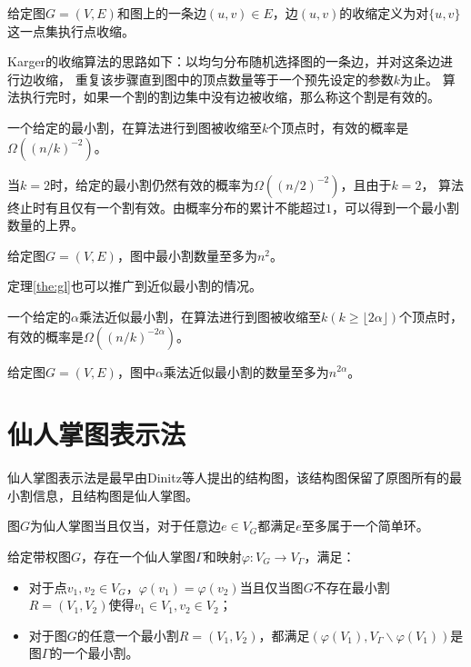 \begin{definition}[边收缩]
    给定图$G=(V,E)$和图上的一条边$(u,v)\in E$，边$(u,v)$的收缩定义为对$\{u,v\}$这一点集执行点收缩。
\end{definition}

Karger的收缩算法的思路如下：以均匀分布随机选择图的一条边，并对这条边进行边收缩，
重复该步骤直到图中的顶点数量等于一个预先设定的参数$k$为止。
算法执行完时，如果一个割的割边集中没有边被收缩，那么称这个割是有效的。

\begin{theorem}\cite{karger1993global}
    \label{the:gl}
    一个给定的最小割，在算法进行到图被收缩至$k$个顶点时，有效的概率是$\Omega((n/k)^{-2})$。
\end{theorem}
当$k=2$时，给定的最小割仍然有效的概率为$\Omega((n/2)^{-2})$，且由于$k=2$，
算法终止时有且仅有一个割有效。由概率分布的累计不能超过$1$，可以得到一个最小割数量的上界。
\begin{theorem}
    \label{the:mincutnumber}
    给定图$G=(V,E)$，图中最小割数量至多为$n^2$。
\end{theorem}

定理\ref{the:gl}也可以推广到近似最小割的情况。
\begin{theorem}\cite{karger1993global}
    \label{the:agl}
    一个给定的$\alpha$乘法近似最小割，在算法进行到图被收缩至$k(k\geq \lfloor2\alpha\rfloor)$个顶点时，
    有效的概率是$\Omega((n/k)^{-2\alpha})$。
\end{theorem}

\begin{theorem}\cite{karger1994random}
    \label{the:approximatemincutnumber}
    给定图$G=(V,E)$，图中$\alpha$乘法近似最小割的数量至多为$n^{2\alpha}$。
\end{theorem}

\section{仙人掌图表示法}

仙人掌图表示法是最早由Dinitz等人提出的结构图，该结构图保留了原图所有的最小割信息，且结构图是仙人掌图。

\begin{definition}
    图$G$为仙人掌图当且仅当，对于任意边$e\in V_G$都满足$e$至多属于一个简单环。
\end{definition}

\begin{theorem}[仙人掌图表示法]\cite{dinitz1976structure}
\label{cactus}
    给定带权图$G$，存在一个仙人掌图$\Gamma$和映射$\varphi:V_G\rightarrow V_\Gamma$，满足：
    \begin{itemize}
        \item 对于点$v_1,v_2\in V_G$，$\varphi(v_1)=\varphi(v_2)$当且仅当图$G$不存在最小割$R=(V_1,V_2)$使得$v_1\in V_1,v_2\in V_2$；
        \item 对于图$G$的任意一个最小割$R=(V_1,V_2)$，都满足$(\varphi(V_1),V_\Gamma\backslash\varphi(V_1))$是图$\Gamma$的一个最小割。
    \end{itemize}
\end{theorem}




